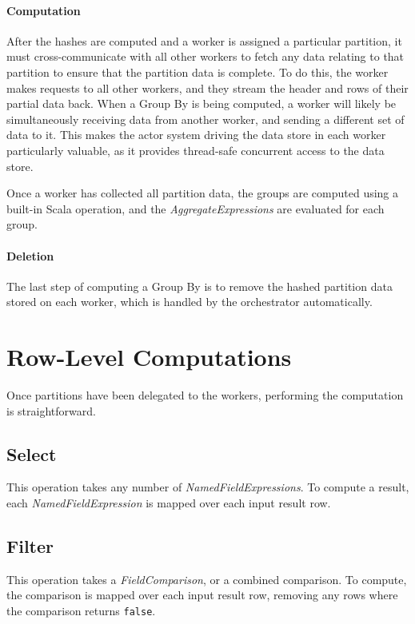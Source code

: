\paragraph{Computation}
After the hashes are computed and a worker is assigned a particular partition, it must cross-communicate with all other workers to fetch any data relating to that partition to ensure that the partition data is complete. To do this, the worker makes requests to all other workers, and they stream the header and rows of their partial data back. When a Group By is being computed, a worker will likely be simultaneously receiving data from another worker, and sending a different set of data to it. This makes the actor system driving the data store in each worker particularly valuable, as it provides thread-safe concurrent access to the data store.

Once a worker has collected all partition data, the groups are computed using a built-in Scala operation, and the \textit{AggregateExpressions} are evaluated for each group.

\paragraph{Deletion}
The last step of computing a Group By is to remove the hashed partition data stored on each worker, which is handled by the orchestrator automatically.



\section{Row-Level Computations}
Once partitions have been delegated to the workers, performing the computation is straightforward. 

\subsection{Select}\label{subsec:select-computation}
This operation takes any number of \textit{NamedFieldExpressions}. To compute a result, each \textit{NamedFieldExpression} is mapped over each input result row. 

\subsection{Filter}\label{subsec:filter-computation}
This operation takes a \textit{FieldComparison}, or a combined comparison. To compute, the comparison is mapped over each input result row, removing any rows where the comparison returns \texttt{false}.



